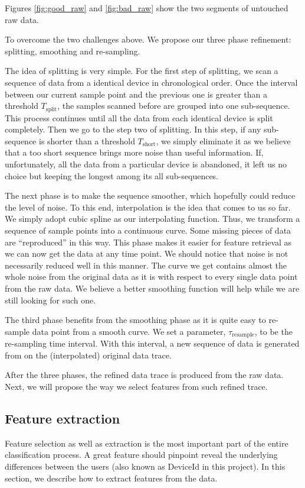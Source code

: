 \documentclass{article} %
\begin{document}
Figures \ref{fig:good_raw} and \ref{fig:bad_raw} show the two segments of untouched raw data. 

To overcome the two challenges above. We propose our three phase refinement: splitting, smoothing and re-sampling.

The idea of splitting is very simple. For the first step of splitting, we scan a sequence of data from a identical device in chronological order. Once the interval between our current sample point and the previous one is greater than a threshold $T_\mathrm{split}$, the samples scanned before are grouped into one sub-sequence. This process continues until all the data from each identical device is split completely. Then we go to the step two of splitting. In this step, if any sub-sequence is shorter than a threshold $T_\mathrm{short}$, we simply eliminate it as we believe that a too short sequence brings more noise than useful information. If, unfortunately, all the data from a particular device is abandoned, it left us no choice but keeping the longest among its all sub-sequences.

The next phase is to make the sequence smoother, which hopefully could reduce the level of noise. To this end, interpolation is the idea that comes to us so far. We simply adopt cubic spline as our interpolating function. Thus, we transform a sequence of sample points into a continuous curve. Some missing pieces of data are ``reproduced'' in this way. This phase makes it easier for feature retrieval as we can now get the data at any time point. We should notice that noise is not necessarily reduced well in this manner. The curve we get contains almost the whole noise from the original data as it is with respect to every single data point from the raw data. We believe a better smoothing function will help while we are still looking for such one.

The third phase benefits from the smoothing phase as it is quite easy to re-sample data point from a smooth curve. We set a parameter, $\tau_\mathrm{resample}$, to be the re-sampling time interval. With this interval, a new sequence of data is generated from on the (interpolated) original data trace.

After the three phases, the refined data trace is produced from the raw data. Next, we will propose the way we select features from such refined trace.

\subsection{Feature extraction}
Feature selection as well as extraction is the most important part of the entire classification process. A great feature should pinpoint reveal the underlying differences between the users (also known as DeviceId in this project). In this section, we describe how to extract features from the data.
	
\end{document}
